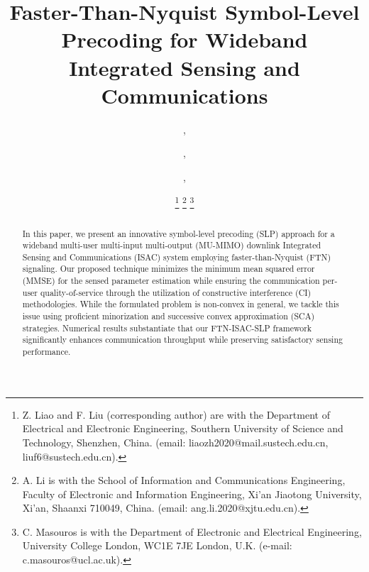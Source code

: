 \documentclass[lettersize,journal]{IEEEtran}
\newcommand{\nocolor}[1]{{\color{black}#1}}
\begin{document}
\title{Faster-Than-Nyquist Symbol-Level Precoding for Wideband Integrated Sensing and Communications}

\author{
  ,
  \and
  ,
  \and
  ,
  \and
  \thanks{Z. Liao and F. Liu (corresponding author) are with the Department of Electrical and Electronic Engineering, Southern University of Science and Technology, Shenzhen, China. (email: liaozh2020@mail.sustech.edu.cn, liuf6@sustech.edu.cn).}
  \thanks{A. Li is with the School of Information and Communications Engineering, Faculty of Electronic and Information Engineering, Xi’an Jiaotong University, Xi’an, Shaanxi 710049, China. (email: ang.li.2020@xjtu.edu.cn).}
  \thanks{C. Masouros is with the Department of Electronic and Electrical Engineering, University College London, WC1E 7JE London, U.K. (e-mail: c.masouros@ucl.ac.uk).}
}



\maketitle

\begin{abstract}
In this paper, we present an innovative symbol-level precoding (SLP) approach for a wideband multi-user multi-input multi-output (MU-MIMO) downlink Integrated Sensing and Communications (ISAC) system employing faster-than-Nyquist (FTN) signaling. Our proposed technique minimizes the minimum mean squared error (MMSE) for the \nocolor{sensed} parameter estimation while ensuring \nocolor{the communication} per-user quality-of-service through the utilization of constructive interference (CI) methodologies. \nocolor{While the formulated problem is non-convex in general, we tackle this issue using proficient minorization and successive convex approximation (SCA) strategies.} Numerical results substantiate that our FTN-ISAC-SLP framework significantly enhances communication throughput while preserving satisfactory sensing performance.
\end{abstract}
\end{document}
